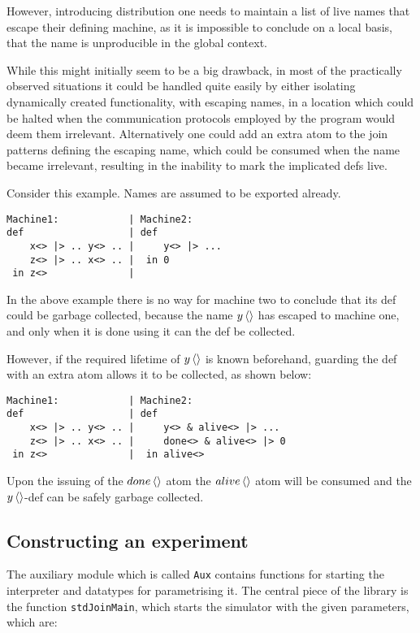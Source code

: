 However, introducing distribution one needs to maintain a list of live names that
escape their defining machine, as it is impossible to
conclude on a local basis, that the name is unproducible in the global context.

While this might initially seem to be a big drawback, in most of the practically
observed situations it could be handled quite easily by either isolating
dynamically created functionality, with escaping names, in a location which
could be halted when the communication protocols employed by the program would
deem them irrelevant.  Alternatively one could add an extra atom to the join
patterns defining the escaping name, which could be consumed when the name
became irrelevant, resulting in the inability to mark the implicated defs live.

Consider this example. Names are assumed to be exported already.
\begin{verbatim}
Machine1:            | Machine2:
def                  | def
    x<> |> .. y<> .. |     y<> |> ...
    z<> |> .. x<> .. |  in 0
 in z<>              |
\end{verbatim}

In the above example there is no way for machine two to conclude that its def
could be garbage collected, because the name $\atm y<>$ has escaped to machine
one, and only when it is done using it can the def be collected.

However, if the required lifetime of $\atm y<>$ is known beforehand, guarding the
def with an extra atom allows it to be collected, as shown below:
\begin{verbatim}
Machine1:            | Machine2:
def                  | def
    x<> |> .. y<> .. |     y<> & alive<> |> ...
    z<> |> .. x<> .. |     done<> & alive<> |> 0
 in z<>              |  in alive<>
\end{verbatim}

Upon the issuing of the $\atm done<>$ atom the $\atm alive<>$ atom will be
consumed and the $\atm y<>$-def can be safely garbage collected.

\subsection{Constructing an experiment}
The auxiliary module which is called \texttt{Aux} contains functions for
starting the interpreter and datatypes for parametrising it. The central piece
of the library is the function \texttt{stdJoinMain}, which starts the simulator
with the given parameters, which are:


